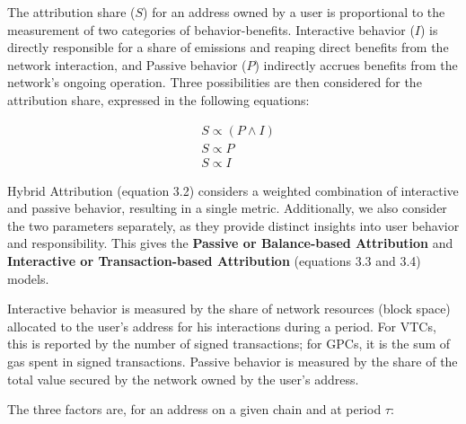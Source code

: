 \documentclass[11pt]{report}
\begin{document}
The attribution share ($S$) for an address owned by a user is proportional to the measurement of two categories of behavior-benefits. Interactive behavior ($I$) is directly responsible for a share of emissions and reaping direct benefits from the network interaction, and Passive behavior ($P$) indirectly accrues benefits from the network's ongoing operation. Three possibilities are then considered for the attribution share, expressed in the following equations:

\begin{align}
     & S \propto (P \wedge I) \\
     & S \propto P            \\
     & S \propto I
    \label{eq:attribution_share}
\end{align}

Hybrid Attribution (equation 3.2) considers a weighted combination of interactive and passive behavior, resulting in a single metric. Additionally, we also consider the two parameters separately, as they provide distinct insights into user behavior and responsibility. This gives the \textbf{Passive or Balance-based Attribution} and \textbf{Interactive or Transaction-based Attribution} (equations 3.3 and 3.4) models.

Interactive behavior is measured by the share of network resources (block space) allocated to the user's address for his interactions during a period. For \ac{VTC}s, this is reported by the number of signed transactions; for \ac{GPC}s, it is the sum of gas spent in signed transactions. Passive behavior is measured by the share of the total value secured by the network owned by the user's address.

The three factors are, for an address on a given chain and at period $\tau$:
\end{document}
